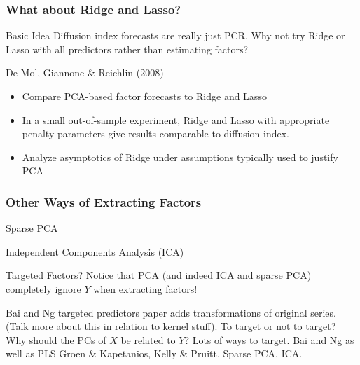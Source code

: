 \documentclass[handout]{beamer}
\begin{document}

\begin{frame}[c]\frametitle{What about Ridge and Lasso?}
    
 \begin{block}
 	{Basic Idea}
 	Diffusion index forecasts are really just PCR. Why not try Ridge or Lasso with all predictors rather than estimating factors?
 \end{block}

 \begin{block}
 	{De Mol, Giannone \& Reichlin (2008)}
 	\begin{itemize}
 		\item Compare PCA-based factor forecasts to Ridge and Lasso
 		\item In a small out-of-sample experiment, Ridge and Lasso with appropriate penalty parameters give results comparable to diffusion index.
 		\item Analyze asymptotics of Ridge under assumptions typically used to justify PCA
 	\end{itemize}
 
 \end{block}



\end{frame}
\begin{frame}[c]\frametitle{Other Ways of Extracting Factors}
    
    \begin{block}
    	{Sparse PCA}
    \end{block}

    \begin{block}
    	{Independent Components Analysis (ICA)}
    \end{block}

   	\begin{block}
   		{Targeted Factors?}
   		Notice that PCA (and indeed ICA and sparse PCA) completely ignore $Y$ when extracting factors!
   	\end{block}
Bai and Ng targeted predictors paper adds transformations of original series. (Talk more about this in relation to kernel stuff). To target or not to target? Why should the PCs of $X$ be related to $Y$? Lots of ways to target. Bai and Ng as well as PLS Groen \& Kapetanios, Kelly \& Pruitt. Sparse PCA, ICA.

\end{frame}
\end{document}
